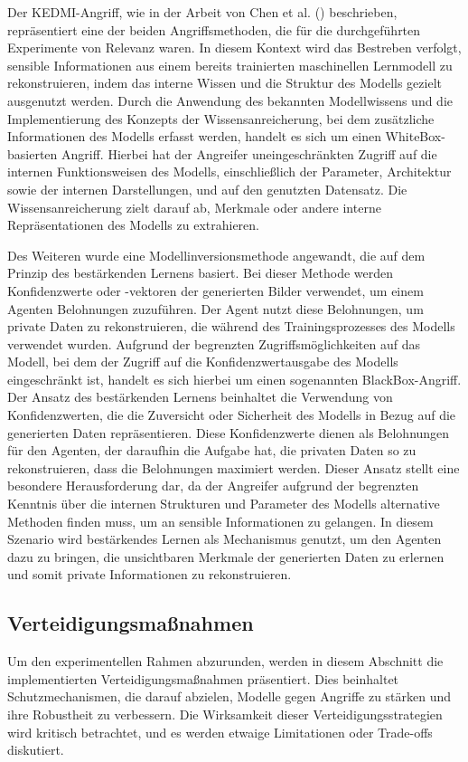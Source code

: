 Der \glqq KEDMI\grqq-Angriff, wie in der Arbeit von Chen et al. (\cite{chen_knowledge-enriched_2021}) beschrieben, repräsentiert eine der beiden Angriffsmethoden, die für die durchgeführten Experimente von Relevanz waren. In diesem Kontext wird das Bestreben verfolgt, sensible Informationen aus einem bereits trainierten maschinellen Lernmodell zu rekonstruieren, indem das interne Wissen und die Struktur des Modells gezielt ausgenutzt werden. Durch die Anwendung des bekannten Modellwissens und die Implementierung des Konzepts der \glqq Wissensanreicherung\grqq, bei dem zusätzliche Informationen des Modells erfasst werden, handelt es sich um einen \glqq WhiteBox-basierten\grqq{} Angriff. Hierbei hat der Angreifer uneingeschränkten Zugriff auf die internen Funktionsweisen des Modells, einschließlich der Parameter, Architektur sowie der internen Darstellungen, und auf den genutzten Datensatz. Die Wissensanreicherung zielt darauf ab, Merkmale oder andere interne Repräsentationen des Modells zu extrahieren.

Des Weiteren wurde eine Modellinversionsmethode angewandt, die auf dem Prinzip des bestärkenden Lernens basiert. Bei dieser Methode werden Konfidenzwerte oder -vektoren der generierten Bilder verwendet, um einem Agenten Belohnungen zuzuführen. Der Agent nutzt diese Belohnungen, um private Daten zu rekonstruieren, die während des Trainingsprozesses des Modells verwendet wurden. Aufgrund der begrenzten Zugriffsmöglichkeiten auf das Modell, bei dem der Zugriff auf die Konfidenzwertausgabe des Modells eingeschränkt ist, handelt es sich hierbei um einen sogenannten BlackBox-Angriff.
Der Ansatz des bestärkenden Lernens beinhaltet die Verwendung von Konfidenzwerten, die die Zuversicht oder Sicherheit des Modells in Bezug auf die generierten Daten repräsentieren. Diese Konfidenzwerte dienen als Belohnungen für den Agenten, der daraufhin die Aufgabe hat, die privaten Daten so zu rekonstruieren, dass die Belohnungen maximiert werden.
Dieser Ansatz stellt eine besondere Herausforderung dar, da der Angreifer aufgrund der begrenzten Kenntnis über die internen Strukturen und Parameter des Modells alternative Methoden finden muss, um an sensible Informationen zu gelangen. In diesem Szenario wird bestärkendes Lernen als Mechanismus genutzt, um den Agenten dazu zu bringen, die unsichtbaren Merkmale der generierten Daten zu erlernen und somit private Informationen zu rekonstruieren.
\subsection{Verteidigungsmaßnahmen}
Um den experimentellen Rahmen abzurunden, werden in diesem Abschnitt die implementierten Verteidigungsmaßnahmen präsentiert. Dies beinhaltet Schutzmechanismen, die darauf abzielen, Modelle gegen Angriffe zu stärken und ihre Robustheit zu verbessern. Die Wirksamkeit dieser Verteidigungsstrategien wird kritisch betrachtet, und es werden etwaige Limitationen oder Trade-offs diskutiert.

